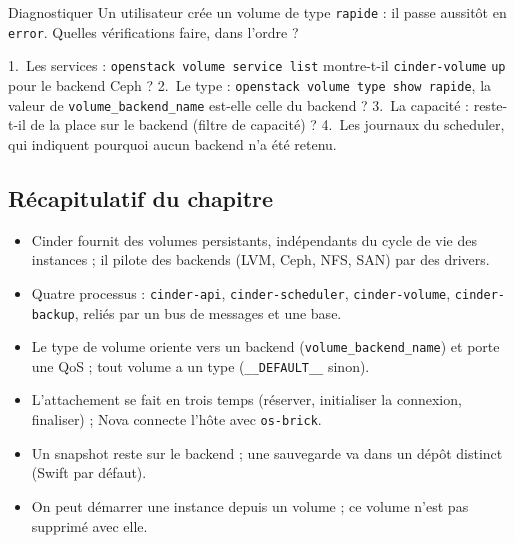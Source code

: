 \begin{exercice}{Diagnostiquer}\label{ex:ci-diag}
Un utilisateur crée un volume de type \texttt{rapide} : il passe aussitôt en \texttt{error}. Quelles vérifications faire, dans
l'ordre ?
\end{exercice}
\begin{correction}
1.~Les services : \texttt{openstack volume service list} montre-t-il \texttt{cinder-volume} \texttt{up} pour le backend Ceph ?
2.~Le type : \texttt{openstack volume type show rapide}, la valeur de \texttt{volume\_\allowbreak backend\_\allowbreak name} est-elle celle du backend ?
3.~La capacité : reste-t-il de la place sur le backend (filtre de capacité) ? 4.~Les journaux du scheduler, qui indiquent
pourquoi aucun backend n'a été retenu.
\end{correction}

\subsection{Récapitulatif du chapitre}\label{sec:ci-recap}

\begin{aretenir}
\begin{itemize}
  \item Cinder fournit des volumes persistants, indépendants du cycle de vie des instances ; il pilote des backends
        (LVM, Ceph, NFS, SAN) par des drivers.
  \item Quatre processus : \texttt{cinder-api}, \texttt{cinder-scheduler}, \texttt{cinder-volume}, \texttt{cinder-backup}, reliés par
        un bus de messages et une base.
  \item Le type de volume oriente vers un backend (\texttt{volume\_\allowbreak backend\_\allowbreak name}) et porte une QoS ; tout volume
        a un type (\texttt{\_\_DEFAULT\_\_} sinon).
  \item L'attachement se fait en trois temps (réserver, initialiser la connexion, finaliser) ; Nova connecte l'hôte avec \texttt{os-brick}.
  \item Un snapshot reste sur le backend ; une sauvegarde va dans un dépôt distinct (Swift par défaut).
  \item On peut démarrer une instance depuis un volume ; ce volume n'est pas supprimé avec elle.
\end{itemize}
\end{aretenir}

